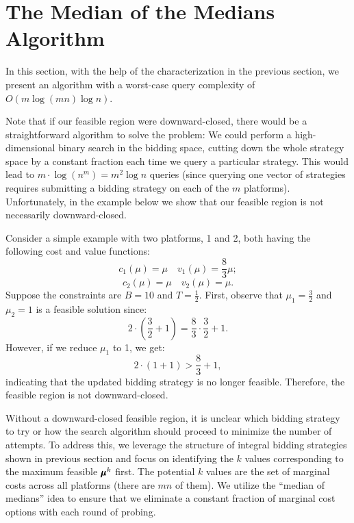\section{The Median of the Medians Algorithm}\label{sec:mom}
In this section, with the help of the characterization in the previous section, we present an algorithm 
with a worst-case query complexity of $O(m \log (mn) \log n)$. {Note that if our feasible region were downward-closed, there would be a straightforward algorithm to solve the problem: We could perform a high-dimensional binary search in the bidding space, cutting down the whole strategy space by a constant fraction each time we query a particular strategy. This would lead to \(m \cdot \log(n^m) = m^2 \log n\) queries (since querying one vector of strategies %
requires submitting a bidding strategy on each of the \(m\) platforms). Unfortunately, in the example below we show that our feasible region is not necessarily downward-closed. 

\begin{example}
Consider a simple example with two platforms, 1 and 2, both having the following cost and value functions:
\[
c_1(\mu) = \mu \quad v_1(\mu) = \frac{8}{3} \mu;
\]
\[
c_2(\mu) = \mu \quad v_2(\mu) = \mu.
\]
Suppose the constraints are \(B = 10\) and \(T = \frac{1}{2}\). First, observe that \(\mu_1 = \frac{3}{2}\) and \(\mu_2 = 1\) is a feasible solution since:
\[
2 \cdot \left( \frac{3}{2} + 1 \right) = \frac{8}{3} \cdot \frac{3}{2} + 1.
\]
However, if we reduce \(\mu_1\) to 1, we get:
\[
2 \cdot (1 + 1) > \frac{8}{3} + 1,
\]
indicating that the updated bidding strategy is no longer feasible. Therefore, the feasible region is not downward-closed.
\end{example}

Without a downward-closed feasible region, it is unclear which bidding strategy to try or how the search algorithm should proceed to minimize the number of attempts. To address this, we leverage the structure of integral bidding strategies shown in previous section and focus on identifying the \(k\) values corresponding to the maximum feasible \(\pmb{\mu}^k\) first. The potential \(k\) values are the set of marginal costs across all platforms (there are \(mn\) of them). We utilize the ``median of medians'' idea to ensure that we eliminate a constant fraction of marginal cost options with each round of probing.} 

